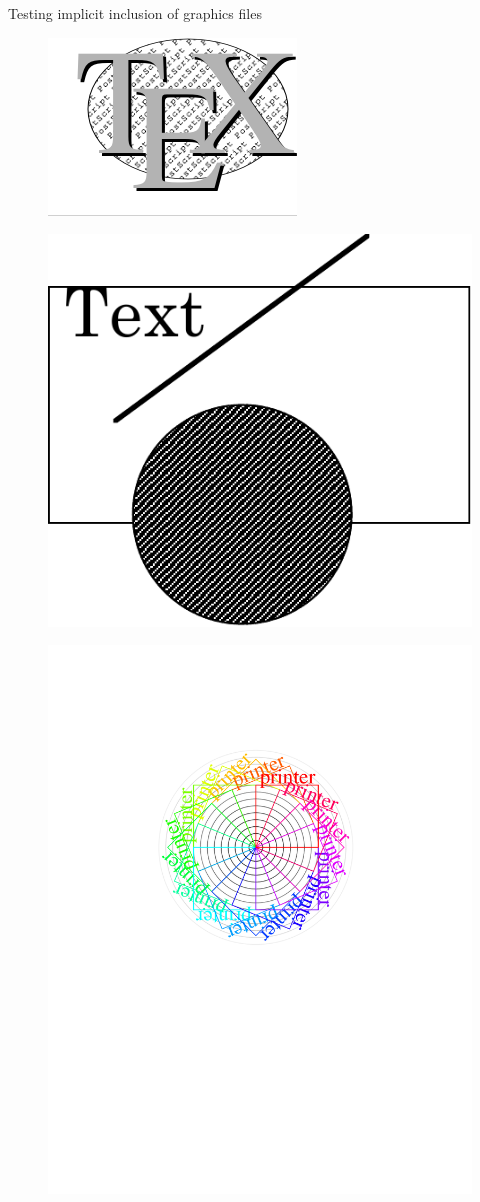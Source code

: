 \documentclass{article}
\begin{document}
Testing implicit inclusion of graphics files

\begin{figure}
\includegraphics{fig_testa}
\end{figure}

\begin{figure}
\includegraphics{fig_testb}
\end{figure}

\begin{figure}
\includegraphics{fig_testc}
\end{figure}
\end{document}
